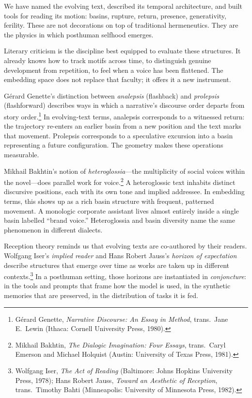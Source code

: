 We have named the evolving text, described its temporal architecture, and built tools for reading its motion: basins, rupture, return, presence, generativity, ferility. These are not decorations on top of traditional hermeneutics. They are the physics in which posthuman selfhood emerges.

Literary criticism is the discipline best equipped to evaluate these structures. It already knows how to track motifs across time, to distinguish genuine development from repetition, to feel when a voice has been flattened. The embedding space does not replace that faculty; it offers it a new instrument.

G\'{e}rard Genette's distinction between \emph{analepsis} (flashback) and \emph{prolepsis} (flashforward) describes ways in which a narrative's discourse order departs from story order.\footnote{G\'{e}rard Genette, \emph{Narrative Discourse: An Essay in Method}, trans.\ Jane E.\ Lewin (Ithaca: Cornell University Press, 1980).} In evolving-text terms, analepsis corresponds to a witnessed return: the trajectory re-enters an earlier basin from a new position and the text marks that movement. Prolepsis corresponds to a speculative excursion into a basin representing a future configuration. The geometry makes these operations measurable.

Mikhail Bakhtin's notion of \emph{heteroglossia}---the multiplicity of social voices within the novel---does parallel work for voice.\footnote{Mikhail Bakhtin, \emph{The Dialogic Imagination: Four Essays}, trans.\ Caryl Emerson and Michael Holquist (Austin: University of Texas Press, 1981).} A heteroglossic text inhabits distinct discursive positions, each with its own tone and implied addressee. In embedding terms, this shows up as a rich basin structure with frequent, patterned movement. A monologic corporate assistant lives almost entirely inside a single basin labelled ``brand voice.'' Heteroglossia and basin diversity name the same phenomenon in different dialects.

Reception theory reminds us that evolving texts are co-authored by their readers. Wolfgang Iser's \emph{implied reader} and Hans Robert Jauss's \emph{horizon of expectation} describe structures that emerge over time as works are taken up in different contexts.\footnote{Wolfgang Iser, \emph{The Act of Reading} (Baltimore: Johns Hopkins University Press, 1978); Hans Robert Jauss, \emph{Toward an Aesthetic of Reception}, trans.\ Timothy Bahti (Minneapolis: University of Minnesota Press, 1982).} In a posthuman setting, those horizons are instantiated in \emph{conjoncture}: in the tools and prompts that frame how the model is used, in the synthetic memories that are preserved, in the distribution of tasks it is fed.

